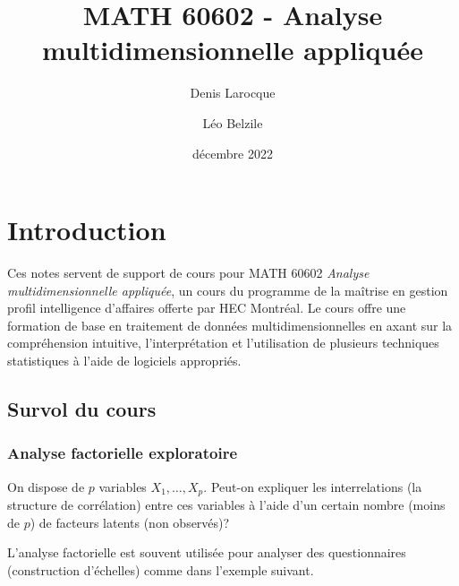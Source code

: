 \documentclass[
  11pt,
  letterpaper,
]{book}
\title{MATH 60602 - Analyse multidimensionnelle appliquée}
\author{Denis Larocque \and Léo Belzile}
\date{décembre 2022}
\renewcommand*\contentsname{Table des matières}
\newcommand\contentsname{Table des matières}
\theoremstyle{definition}
\theoremstyle{remark}
\begin{document}
\frontmatter
\maketitle
\ifdefined\Shaded\renewenvironment{Shaded}{\begin{tcolorbox}[borderline west={3pt}{0pt}{shadecolor}, frame hidden, interior hidden, sharp corners, breakable, boxrule=0pt, enhanced]}{\end{tcolorbox}}\fi

\renewcommand*\contentsname{Table des matières}
{
\setcounter{tocdepth}{2}
\tableofcontents
}
\mainmatter
{}

\hypertarget{introduction}{%
\chapter{Introduction}\label{introduction}}

Ces notes servent de support de cours pour MATH 60602 \emph{Analyse
multidimensionnelle appliquée}, un cours du programme de la maîtrise en
gestion profil intelligence d'affaires offerte par HEC Montréal. Le
cours offre une formation de base en traitement de données
multidimensionnelles en axant sur la compréhension intuitive,
l'interprétation et l'utilisation de plusieurs techniques statistiques à
l'aide de logiciels appropriés.

\hypertarget{survol-du-cours}{%
\section{Survol du cours}\label{survol-du-cours}}

\hypertarget{analyse-factorielle-exploratoire}{%
\subsection{Analyse factorielle
exploratoire}\label{analyse-factorielle-exploratoire}}

On dispose de \(p\) variables \(X_1, \ldots, X_p\). Peut-on expliquer
les interrelations (la structure de corrélation) entre ces variables à
l'aide d'un certain nombre (moins de \(p\)) de facteurs latents (non
observés)?

L'analyse factorielle est souvent utilisée pour analyser des
questionnaires (construction d'échelles) comme dans l'exemple suivant.
\end{document}
